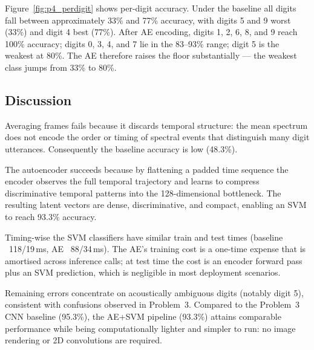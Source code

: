 Figure~\ref{fig:p4_perdigit} shows per-digit accuracy. Under the baseline all digits fall between approximately 33\% and 77\% accuracy, with digits 5 and 9 worst (33\%) and digit 4 best (77\%). After AE encoding, digits 1, 2, 6, 8, and 9 reach 100\% accuracy; digits 0, 3, 4, and 7 lie in the 83--93\% range; digit 5 is the weakest at 80\%. The AE therefore raises the floor substantially — the weakest class jumps from 33\% to 80\%.

\subsection{Discussion}
Averaging frames fails because it discards temporal structure: the mean spectrum does not encode the order or timing of spectral events that distinguish many digit utterances. Consequently the baseline accuracy is low (48.3\%).

The autoencoder succeeds because by flattening a padded time sequence the encoder observes the full temporal trajectory and learns to compress discriminative temporal patterns into the 128-dimensional bottleneck. The resulting latent vectors are dense, discriminative, and compact, enabling an SVM to reach 93.3\% accuracy.

Timing-wise the SVM classifiers have similar train and test times (baseline ~118/19\,ms, AE ~88/34\,ms). The AE's training cost is a one-time expense that is amortised across inference calls; at test time the cost is an encoder forward pass plus an SVM prediction, which is negligible in most deployment scenarios.

Remaining errors concentrate on acoustically ambiguous digits (notably digit 5), consistent with confusions observed in Problem~3. Compared to the Problem~3 CNN baseline (95.3\%), the AE+SVM pipeline (93.3\%) attains comparable performance while being computationally lighter and simpler to run: no image rendering or 2D convolutions are required.

\endgroup